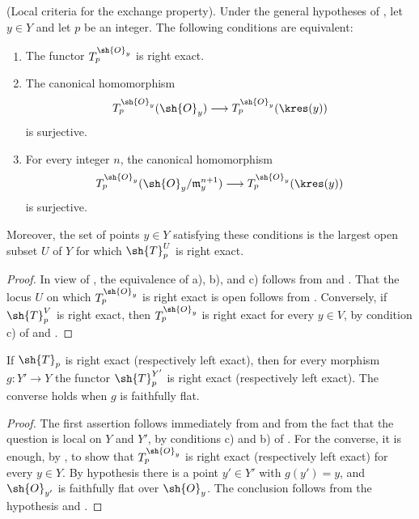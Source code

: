 \begin{proposition}[7.7.10]
\label{III.7.7.10}
\textnormal{(Local criteria for the exchange property).}
Under the general hypotheses of , let
$y\in Y$ and let $p$ be an integer.  The following
conditions are equivalent:
\begin{enumerate}
  \item[a)] The functor $T_p^{\sh{O}_y}$ is right exact.

  \item[b)] The canonical homomorphism
    \[
      T_p^{\sh{O}_y}(\sh{O}_y)
      \longrightarrow
      T_p^{\sh{O}_y}(\kres(y))
    \]
    is surjective.

  \item[c)] For every integer $n$, the canonical
    homomorphism
    \[
      T_p^{\sh{O}_y}
      (\sh{O}_y/\mathfrak m_y^{n+1})
      \longrightarrow
      T_p^{\sh{O}_y}(\kres(y))
    \]
    is surjective.
\end{enumerate}
Moreover, the set of points $y\in Y$ satisfying these
conditions is the largest open subset $U$ of $Y$ for which
$\sh{T}^U_p$ is right exact.
\end{proposition}

\begin{proof}
In view of , the equivalence of a), b), and
c) follows from  and .
That the locus $U$ on which $T_p^{\sh{O}_y}$ is right exact
is open follows from .  Conversely, if
$\sh{T}^V_p$ is right exact, then
$T_p^{\sh{O}_y}$ is right exact for every $y\in V$, by
condition c) of  and .
\end{proof}

\begin{corollary}[7.7.11]
\label{III.7.7.11}
If $\sh{T}_p$ is right exact (respectively left exact), then
for every morphism $g:Y'\to Y$ the functor
$\sh{T}^{Y'}_p$ is right exact (respectively left exact).
The converse holds when $g$ is faithfully flat.
\end{corollary}

\begin{proof}
The first assertion follows immediately from
 and from the fact that the question is
local on $Y$ and $Y'$, by conditions c) and b) of
.  For the converse, it is enough, by
, to show that $T_p^{\sh{O}_y}$ is right
exact (respectively left exact) for every $y\in Y$.  By
hypothesis there is a point $y'\in Y'$ with $g(y')=y$, and
$\sh{O}_{y'}$ is faithfully flat over $\sh{O}_y$.  The
conclusion follows from the hypothesis and
.
\end{proof}

